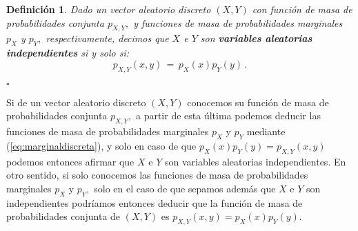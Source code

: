 \documentclass[spanish,10pt,letterpaper]{article}
\newtheorem{defi}{Definición}
\newcommand{\qed}{\begin{flushright}$\square$\end{flushright}}
\begin{document}
\bigskip 

\begin{defi}\label{def:indepdiscreta}
    Dado un vector aleatorio discreto $(X,Y)$ con función de masa de probabilidades conjunta $p_{X,Y},$ y funciones de masa de probabilidades marginales $p_X$ y $p_Y,$ respectivamente, decimos que $X$ e $Y$ son \textbf{variables aleatorias independientes} si y solo si:
    \begin{equation*}
        p_{X,Y}(x,y) \,=\, p_X(x)p_Y(y)\,.
    \end{equation*} \qed 
\end{defi}

Si de un vector aleatorio discreto $(X,Y)$ conocemos su función de masa de probabilidades conjunta $p_{X,Y},$ a partir de esta última podemos deducir las funciones de masa de probabilidades marginales $p_X$ y $p_Y$ mediante (\ref{eq:marginaldiscreta}), y solo en caso de que $p_X(x)p_Y(y)=p_{X,Y}(x,y)$ podemos entonces afirmar que $X$ e $Y$ son variables aleatorias independientes. En otro sentido, si solo conocemos las funciones de masa de probabilidades marginales $p_X$ y $p_Y,$ solo en el caso de que sepamos además que $X$ e $Y$ son independientes podríamos entonces deducir que la función de masa de probabilidades conjunta de $(X,Y)$ es $p_{X,Y}(x,y)=p_X(x)p_Y(y).$

\bigskip
\end{document}
